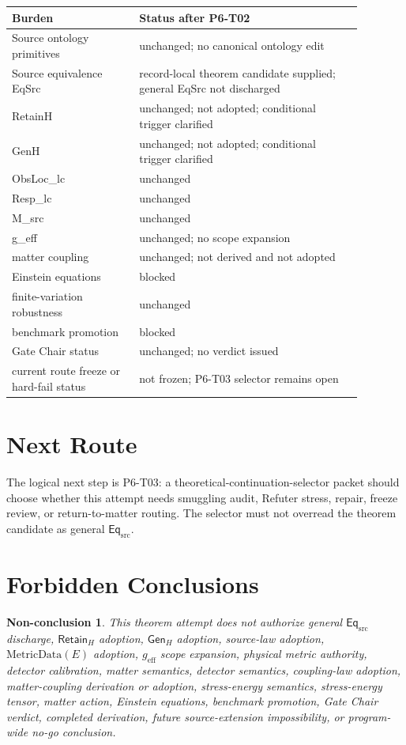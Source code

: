 \documentclass[11pt]{article}
\newcommand{\EqSrc}{\mathsf{Eq}_{\mathrm{src}}}
\newcommand{\RetainH}{\mathsf{Retain}_{H}}
\newcommand{\GenH}{\mathsf{Gen}_{H}}
\newcommand{\MetricData}{\mathrm{MetricData}(E)}
\newcommand{\geff}{g_{\mathrm{eff}}}
\newtheorem{nonconclusion}{Non-conclusion}
\begin{document}
\begin{center}
\begin{tabular}{p{0.32\linewidth}p{0.56\linewidth}}
\toprule
\textbf{Burden} & \textbf{Status after P6-T02} \\
\midrule
Source ontology primitives & unchanged; no canonical ontology edit \\
Source equivalence EqSrc & record-local theorem candidate supplied; general EqSrc not discharged \\
RetainH & unchanged; not adopted; conditional trigger clarified \\
GenH & unchanged; not adopted; conditional trigger clarified \\
ObsLoc\_lc & unchanged \\
Resp\_lc & unchanged \\
M\_src & unchanged \\
g\_eff & unchanged; no scope expansion \\
matter coupling & unchanged; not derived and not adopted \\
Einstein equations & blocked \\
finite-variation robustness & unchanged \\
benchmark promotion & blocked \\
Gate Chair status & unchanged; no verdict issued \\
current route freeze or hard-fail status & not frozen; P6-T03 selector remains open \\
\bottomrule
\end{tabular}
\end{center}

\section{Next Route}

The logical next step is P6-T03: a theoretical-continuation-selector packet
should choose whether this attempt needs smuggling audit, Refuter stress,
repair, freeze review, or return-to-matter routing. The selector must not
overread the theorem candidate as general \(\EqSrc\).

\section{Forbidden Conclusions}

\begin{nonconclusion}
This theorem attempt does not authorize general \(\EqSrc\) discharge,
\(\RetainH\) adoption, \(\GenH\) adoption, source-law adoption,
\(\MetricData\) adoption, \(\geff\) scope expansion, physical metric
authority, detector calibration, matter semantics, detector semantics,
coupling-law adoption, matter-coupling derivation or adoption, stress-energy
semantics, stress-energy tensor, matter action, Einstein equations, benchmark
promotion, Gate Chair verdict, completed derivation, future source-extension
impossibility, or program-wide no-go conclusion.
\end{nonconclusion}
\end{document}
